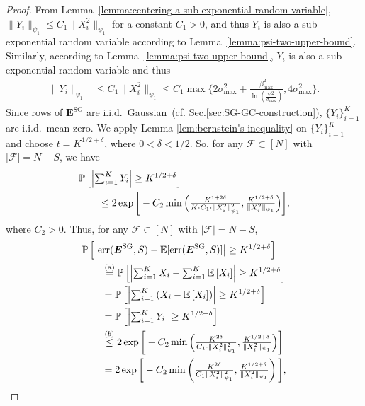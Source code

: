 \documentclass[lettersize,journal]{IEEEtran}
\newcommand{\err}[1]{\mathrm{err}(#1, S)}
\newcommand{\F}{\mathcal{F}}
\newcommand{\GSG}{\boldsymbol{E}^{\mathrm{SG}}}
\newcommand{\prob}[1]{\mathbb{P}\left[#1\right]}
\newcommand{\ex}[1]{\mathbb{E}\left[#1\right]}
\newcommand{\psione}[1]{\|#1\|_{\psi_1} }
\newcommand{\sigmamax}{\sigma_{\max}}
\newcommand{\betamax}{\beta_{\max}}
\begin{document}
{\begin{proof}
From Lemma~\ref{lemma:centering-a-sub-exponential-random-variable}, $\psione{Y_i}\le C_1\psione{X_i^2}$ for a constant $C_1>0$, and thus $Y_i$ is also a sub-exponential random variable according to Lemma~\ref{lemma:psi-two-upper-bound}.
Similarly, according to Lemma~\ref{lemma:psi-two-upper-bound}, $Y_i$ is also a sub-exponential random variable and thus
\begin{align*}
    \psione{Y_i}&\le C_1 \psione{X_i^2}\le C_1\max\bigg\{2\sigmamax^2 + \tfrac{\betamax^2}{\ln{(\tfrac{\sqrt{2}}{\sigmamax})}}, 4\sigmamax^2\bigg\}.
\end{align*}
Since rows of $\GSG$ are i.i.d.\ Gaussian~(cf. Sec.\ref{sec:SG-GC-construction}), $\{Y_i\}_{i=1}^K$ are i.i.d.\ mean-zero. We apply Lemma \ref{lem:bernstein's-inequality} on  $\{Y_i\}_{i=1}^K$ and choose $t = K^{1/2+\delta}$, where $0<\delta<1/2$.
So, for any $\F\subset[N]$ with $|\F| = N-S$, we have 
\begin{align}
    &\prob{\left|\textstyle\sum_{i=1}^{K}Y_i\right|\ge K^{1/2+\delta}}\notag\\
    &\qquad \le 2\exp\bigg[
        -C_2 \min\Big(
            \tfrac{K^{1+2\delta}}{K\cdot C_1\cdot \psione{X_i^2}^2},
            \tfrac{K^{1/2+\delta}}{\psione{X_i^2}}
        \Big)
        \bigg] \label{eq:Y-concentration},
\end{align}
where $C_2>0$. Thus,
for any $\F\subset[N]$ with $|\F| = N-S$,
\begin{align}
    &\prob{\big|\err{\GSG} - \mathbb{E}[{\err{\GSG}}]\big| \geq K^{1/2+\delta}}\notag\\
        &\qquad\overset{\mathrm{(a)}}{=}\prob{\left|\textstyle\sum_{i=1}^{K}X_i - \sum_{i=1}^{K}\ex{X_i}\right|\geq K^{1/2+\delta}}\notag\\
        &\qquad=\prob{\left|\textstyle\sum_{i=1}^{K}\left(X_i - \ex{X_i}\right)\right|\geq K^{1/2+\delta}}\notag\\
        &\qquad= \prob{\left|\textstyle\sum_{i=1}^{K}Y_i\right|\geq K^{1/2+\delta}}
        \notag\\
        &\qquad\overset{(b)}{\le}2\exp\bigg[
        -C_2 \min\Big(
            \tfrac{K^{2\delta}}{ C_1\cdot\psione{X_i^2}^2},
            \tfrac{K^{1/2+\delta}}{\psione{X_i^2}}
        \Big)
        \bigg]
        \\
        &\qquad=2\exp\bigg[
        -C_2 \min\left(
            \tfrac{K^{2\delta}}{C_1\psione{X_i^2}^2},
            \tfrac{K^{1/2+\delta}}{\psione{X_i^2}}
        \right)
        \bigg], 
        \label{eqn:prob-existence}
\end{align}

\end{proof}}
\end{document}
